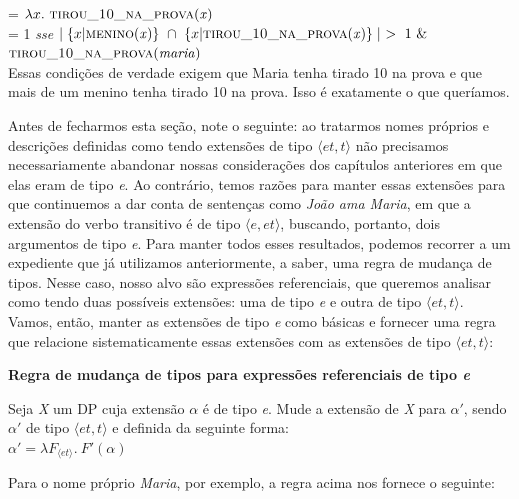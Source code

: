 \n{} = $\lambda x.\ \predica{tirou\_10\_na\_prova}{x}$\\

\n {} = 1 \textit{sse} $\mid \{x | \text{\textsc{menino}(\textit{x})}\}\ \cap\ \{x | \text{\textsc{tirou\_10\_na\_prova}(\textit{x})}\}\mid\ >\ 1\ \& $ \\
\hspace*{\fill} $\text{\textsc{tirou\_10\_na\_prova}(\textit{maria})}$\\

\n Essas condições de verdade exigem que Maria tenha tirado 10 na
prova e que mais de um menino tenha tirado 10 na prova. Isso é
exatamente o que queríamos.

Antes de fecharmos esta seção, note o seguinte: ao tratarmos nomes
próprios e descrições definidas como tendo extensões de tipo
$\langle et,t\rangle$ não precisamos necessariamente abandonar
nossas considerações dos capítulos anteriores em que elas eram de
tipo \textit{e}. Ao contrário, temos razões para manter essas
extensões para que continuemos a dar conta de sentenças como
\textit{João ama Maria}, em que a extensão do verbo transitivo é
de tipo $\langle e,et\rangle$, buscando, portanto, dois argumentos
de tipo \textit{e}. Para manter todos esses resultados, podemos
recorrer a um expediente que já utilizamos anteriormente, a saber,
uma regra de mudança de tipos. Nesse caso, nosso alvo são
expressões referenciais, que queremos analisar como tendo duas
possíveis extensões: uma de tipo \textit{e} e outra de tipo
$\langle et,t\rangle$. Vamos, então, manter as extensões de tipo
\textit{e} como básicas e fornecer uma regra que relacione
sistematicamente essas extensões com as extensões de tipo $\langle et,t\rangle$:\\

\begin{tcolorbox}[boxrule=0pt,sharp corners]

\n \textbf{Regra de mudança de tipos para expressões referenciais de tipo \textit{e}}

\n Seja \textit{X} um DP cuja extensão $\alpha$ é de tipo
\textit{e}. Mude a extensão de \textit{X} para $\alpha '$,
sendo $\alpha '$ de tipo $\langle et,t\rangle$ e definida da
seguinte forma:\\

\n $\alpha' = \lambda F_{\langle et\rangle}.\ F'(\alpha)$

\end{tcolorbox}

\bigskip

\n Para o nome próprio \textit{Maria}, por exemplo, a regra acima nos fornece o seguinte:\\

